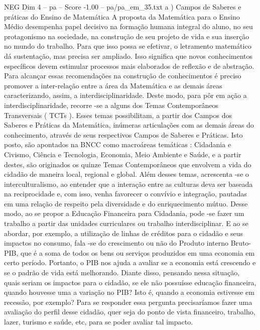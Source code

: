 \begin{textsample}{NEG Dim 4 – pa – Score -1.00 – pa/pa\_em\_35.txt}  \label{ex:f4_neg_279}
a ) Campos de Saberes e práticas do Ensino de Matemática A proposta da Matemática para o Ensino Médio desempenha papel decisivo na formação humana integral do aluno, no seu protagonismo na sociedade, na construção de seu projeto de vida e sua inserção no mundo do trabalho.
Para que isso possa se efetivar, o letramento matemático dá sustentação, mas precisa ser ampliado.
Isso significa que novos conhecimentos específicos devem estimular processos mais elaborados de reflexão e de abstração.
Para alcançar essas recomendações na construção de conhecimentos é preciso promover a inter-relação entre a área da Matemática e as demais áreas caracterizando, assim, a interdisciplinaridade.
Deste modo, para pôr em ação a interdisciplinaridade, recorre -se a alguns dos Temas Contemporâneos Transversais ( TCTs ).
Esses temas possibilitam, a partir dos Campos dos Saberes e Práticas da Matemática, inúmeras articulações com as demais áreas do conhecimento, através de seus respectivos Campos de Saberes e Práticas.
Isto posto, são apontados na BNCC como macroáreas temáticas : Cidadania e Civismo, Ciência e Tecnologia, Economia, Meio Ambiente e Saúde, e a partir destes, são originados os quinze Temas Contemporâneos que envolvem a vida do cidadão de maneira local, regional e global.
Além desses temas, acrescenta -se o interculturalismo, ao entender que a interação entre as culturas deva ser baseada na reciprocidade e, com isso, venha favorecer o convívio e integração, pautadas em uma relação de respeito pela diversidade e do enriquecimento mútuo.
Desse modo, ao se propor a Educação Financeira para Cidadania, pode -se fazer um trabalho a partir das unidades curriculares ou trabalho interdisciplinar.
E ao se abordar, por exemplo, a utilização de linhas de créditos para o cidadão e seus impactos no consumo, fala -se do crescimento ou não do Produto interno Bruto-PIB, que é a soma de todos os bens ou serviços produzidos em uma economia em certo período.
Portanto, o PIB nos ajuda a avaliar se a economia está crescendo e se o padrão de vida está melhorando.
Diante disso, pensando nessa situação, quais seriam os impactos para o cidadão, se ele não possuísse educação financeira, quando houvesse uma a variação no PIB?
Isto é, quando a economia estivesse em recessão, por exemplo?
Para se responder essa pergunta precisaríamos fazer uma avaliação do perfil desse cidadão, quer seja do ponto de vista financeiro, trabalho, lazer, turismo e saúde, etc, para se poder avaliar tal impacto.

\end{textsample}

